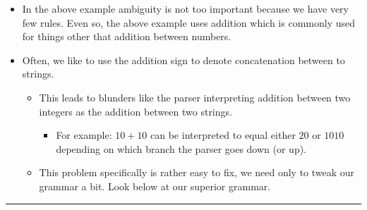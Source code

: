 \documentclass{article}
\begin{document}
\begin{itemize}
	\item In the above example ambiguity is not too important because we have very few rules. Even so, the above example uses addition which is commonly used for things other that addition between numbers. 
	\item Often, we like to use the addition sign to denote concatenation between to strings.
	\begin{itemize}
		\item This leads to blunders like the parser interpreting addition between two integers as the addition between two strings.
		\begin{itemize}
			\item For example: $10+10$ can be interpreted to equal either $20$ or $1010$ depending on which branch the parser goes down (or up).
		\end{itemize}
		\item This problem specifically is rather easy to fix, we need only to tweak our grammar a bit. Look below at our superior grammar.
	\end{itemize}
\end{itemize}

\hrule
\end{document}

